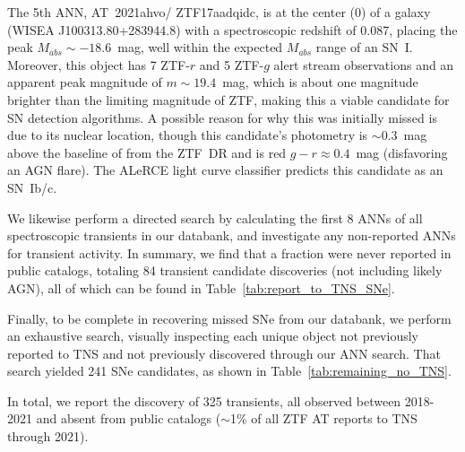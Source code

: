 \documentclass[twocolumn]{aastex63}
\begin{document}
The 5th ANN, AT~2021ahvo/ ZTF17aadqidc, is at the center (0) of a galaxy (WISEA J100313.80+283944.8) with a spectroscopic redshift of 0.087, placing the peak $M_{abs}\sim-18.6$~mag, well within the expected $M_{abs}$ range of an SN~I. Moreover, this object has 7 ZTF-$r$ and 5 ZTF-$g$ alert stream observations and an apparent peak magnitude of $m\sim19.4$~mag, which is about one magnitude brighter than the limiting magnitude of ZTF, making this a viable candidate for SN detection algorithms. A possible reason for why this was initially missed is due to its nuclear location, though this candidate's photometry is $\sim0.3$~mag above the baseline of from the ZTF~DR and is red $g-r\approx0.4$~mag (disfavoring an AGN flare). The ALeRCE light curve classifier \cite{SanchezSaez2021} predicts this candidate as an SN~Ib/c. \par

We likewise perform a directed search by calculating the first 8 ANNs of all spectroscopic transients in our databank, and investigate any non-reported ANNs for transient activity. In summary, we find that a fraction were never reported in public catalogs, totaling 84 transient candidate discoveries (not including likely AGN), all of which can be found in Table~\ref{tab:report_to_TNS_SNe}. \par

Finally, to be complete in recovering missed SNe from our databank, we perform an exhaustive search, visually inspecting each unique object not previously reported to TNS and not previously discovered through our ANN search. That search yielded 241 SNe candidates, as shown in Table~\ref{tab:remaining_no_TNS}. \par

In total, we report the discovery of 325 transients, all observed between 2018-2021 and absent from public catalogs ($\sim$1\% of all ZTF AT reports to TNS through 2021). \par



\end{document}
